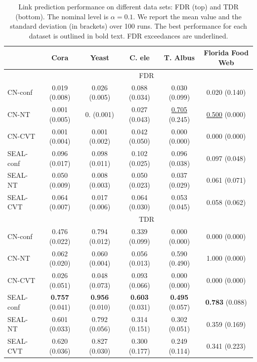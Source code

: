 \documentclass[a4paper, 11pt]{article}
\theoremstyle{remark}
\begin{document}
\begin{table}
\caption{Link prediction performance on different data sets: FDR (top) and TDR (bottom). The nominal level is $\alpha=0.1$. We report the mean value and the standard deviation (in brackets) over 100 runs. The best performance for each dataset is outlined in bold text. FDR exceedances are underlined. }

{\small
 \begin{tabular}{l|ccccc}
& Cora & Yeast & C. ele & T. Albus  & Florida Food Web \\
\hline \hline
& \multicolumn{5}{c}{FDR} \\
\hline \hline
CN-conf & 0.019 (0.008)  & 0.026 (0.005) & 0.088 (0.034) & 0.030 (0.099) & 0.020 (0.140) \\
\hline
CN-NT & 0.001 (0.005) & 0. (0.001) & 0.027 (0.043) & \underline{0.705} (0.245) & \underline{0.500} (0.000) \\
\hline
CN-CVT & 0.001 (0.004) & 0.001 (0.002) & 0.042 (0.050) & 0.000 (0.000) & 0.000 (0.000) \\
\hline
SEAL-conf & 0.096 (0.017) & 0.098 (0.011) & 0.102 (0.025) & 0.096 (0.038) & 0.097 (0.048) \\
\hline
SEAL-NT & 0.050 (0.009) & 0.008 (0.003)  & 0.050 (0.023) & 0.037 (0.029) & 0.061 (0.071) \\
\hline
SEAL-CVT & 0.064 (0.007) &  0.017 (0.006) & 0.064 (0.030) & 0.053 (0.045) & 0.058 (0.062) \\
\hline \hline
& \multicolumn{5}{c}{TDR} \\
\hline \hline
CN-conf & 0.476 (0.022)  & 0.794 (0.012) & 0.339 (0.099) & 0.000 (0.000) & 0.000 (0.000) \\
\hline
CN-NT & 0.062 (0.020)  & 0.060 (0.004) & 0.056 (0.013) & 0.590 (0.490) & 1.000 (0.000) \\
\hline
CN-CVT & 0.026 (0.051)  & 0.048 (0.073) & 0.093 (0.066) & 0.000 (0.000) & 0.000 (0.000) \\
\hline
SEAL-conf & \textbf{0.757} (0.041) & \textbf{0.956} (0.010) & \textbf{0.603} (0.031) & \textbf{0.495} (0.057) & \textbf{0.783} (0.088) \\
\hline
SEAL-NT & 0.601 (0.033) & 0.792 (0.056)  & 0.314 (0.151) & 0.302 (0.051) & 0.359 (0.169) \\
\hline
SEAL-CVT & 0.620 (0.036) & 0.827 (0.030)  & 0.300 (0.177) & 0.249 (0.114) & 0.341 (0.223)  \\
\end{tabular}
}
\end{table} \label{lp:tab:perfdatasets}
\end{document}

